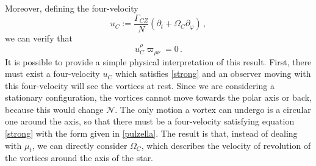 \documentclass[usenatbib%
]{mnras}
\begin{document}
Moreover, defining the four-velocity
\begin{equation}\label{pulzella}
u_C := \dfrac{\Gamma_{CZ}}{N} (\partial_t + \Omega_C \partial_\varphi) \, ,
\end{equation}
we can verify that
\begin{equation}\label{strong}
u_C^\rho \varpi_{\rho \nu} =0 \, .
\end{equation}
It is possible to provide a simple physical interpretation of this result. 
First, there must exist a four-velocity $u_C$ which satisfies \eqref{strong} and an observer moving with this four-velocity will see the vortices at rest. Since we are considering a stationary configuration, the vortices cannot move towards the polar axis or back, because this would change $\mathcal{N}$. 
The only motion a vortex can undergo is a circular one around the axis, so that there must be a four-velocity satisfying equation \eqref{strong} with the form given in \eqref{pulzella}. 
The result is that, instead of dealing with $\mu_t$, we can directly consider $\Omega_C$, which describes the velocity of revolution of the vortices around the axis of the star. 
\end{document}
